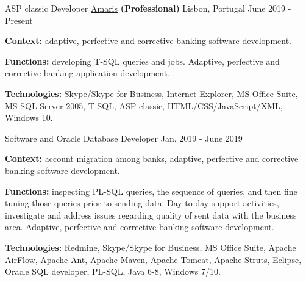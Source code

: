 \begin{cventries}

\vspace{-0.25cm}

  \cventry
    {ASP classic Developer} %
    {\href{https://www.amaris.com/}{Amaris} \textbf{(Professional)}} %
    {Lisbon, Portugal} %
    {June 2019 - Present} %
    {
      \begin{cvitems} %
		\item[] {\textbf{Context:} adaptive, perfective and corrective banking software development. 
}
		\item[] {\textbf{Functions:} developing T-SQL queries and jobs. Adaptive, perfective and corrective banking application development.}		
		\item[] {\textbf{Technologies:} \textcolor{rainbowcolor-green}{Skype/Skype for Business}, \textcolor{rainbowcolor-green}{Internet Explorer}, \textcolor{rainbowcolor-green}{MS Office Suite}, \textcolor{rainbowcolor-green}{MS SQL-Server 2005}, \textcolor{rainbowcolor-indigo}{T-SQL}, \textcolor{rainbowcolor-indigo}{ASP classic}, \textcolor{rainbowcolor-indigo}{HTML/CSS/JavaScript/XML},  \textcolor{rainbowcolor-orange}{Windows 10}.}		
      \end{cvitems}
    } 
    
  \cventry
    {Software and Oracle Database Developer} %
    {} %
    {} %
    {Jan. 2019 - June 2019} %
    {
      \begin{cvitems} %
		\item[] {\textbf{Context:} account migration among banks, adaptive, perfective and corrective banking software development. 
}
		\item[] {\textbf{Functions:} inspecting PL-SQL queries, the sequence of queries, and then fine tuning those queries prior to sending data. Day to day support activities, investigate and address issues regarding quality of sent data with the business area. Adaptive, perfective and corrective banking software development.}		
		\item[] {\textbf{Technologies:} \textcolor{rainbowcolor-green}{Redmine}, \textcolor{rainbowcolor-green}{Skype/Skype for Business}, \textcolor{rainbowcolor-green}{MS Office Suite}, \textcolor{rainbowcolor-green}{Apache AirFlow}, \textcolor{rainbowcolor-green}{Apache Ant}, \textcolor{rainbowcolor-green}{Apache Maven}, \textcolor{rainbowcolor-green}{Apache Tomcat}, \textcolor{rainbowcolor-green}{Apache Struts}, \textcolor{rainbowcolor-green}{Eclipse}, \textcolor{rainbowcolor-green}{Oracle SQL developer}, \textcolor{rainbowcolor-indigo}{PL-SQL}, \textcolor{rainbowcolor-indigo}{Java 6-8}, \textcolor{rainbowcolor-orange}{Windows 7/10}.}		
      \end{cvitems}
    } 
    

\end{cventries}
